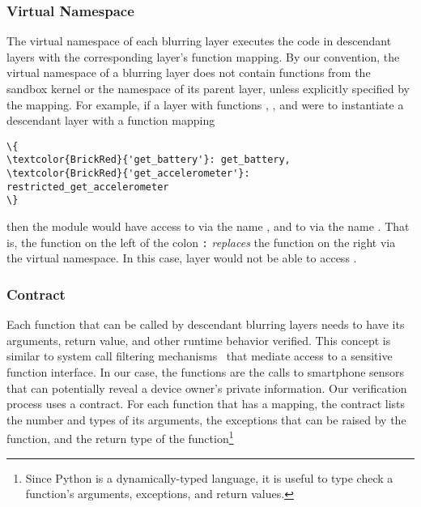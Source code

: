 \subsubsection{Virtual Namespace}

The virtual namespace of each blurring layer executes the code in descendant 
layers with the corresponding layer's function mapping. By our convention, 
the virtual namespace of a blurring layer does not contain functions from the 
sandbox kernel or the namespace of its parent layer, unless explicitly 
specified by the mapping. 
For example, if a layer  with 
functions , , and 
 were to instantiate a descendant 
layer  with a function mapping 

\begin{Verbatim}
\{
\textcolor{BrickRed}{'get_battery'}: get_battery, 
\textcolor{BrickRed}{'get_accelerometer'}: restricted_get_accelerometer
\}
\end{Verbatim}
then the module  would have access
to  via the name , and to
 via the name 
. That is, the function on the left of the colon \texttt{:}
\textit{replaces} the function on the right via the virtual namespace. 
In this case, layer  would not be able to access 
.

\subsubsection{Contract}

%
Each function that can be called by descendant blurring
layers needs to have its arguments, return value, and 
other runtime behavior verified. This concept is similar to system call filtering
mechanisms~\cite{acharya2000mapbox, fraser2000hardening} 
that mediate access to a sensitive function interface. In our case, 
the functions are the calls to smartphone sensors that 
can potentially reveal a device owner's private information. Our
verification process uses a contract. For each function that has a 
mapping, the contract lists the number 
and types of its arguments, the exceptions that can be raised 
by the function, and the return type of the function\footnote{\scriptsize 
Since Python is a dynamically-typed language, it is useful to type check 
a function's arguments, exceptions, and return values.}

